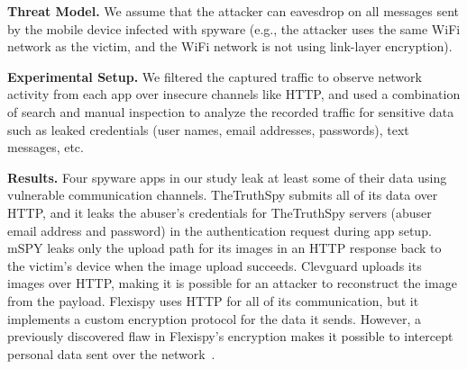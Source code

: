 \textbf{Threat Model.} We assume that the attacker can eavesdrop on
all messages sent by the mobile device infected with spyware (e.g.,
the attacker uses the same WiFi network as the victim, and the WiFi
network is not using link-layer encryption).



\textbf{Experimental Setup.}
We filtered the captured traffic to observe network activity from each app over
insecure channels like HTTP, and used a combination of search and
manual inspection to analyze the recorded traffic for sensitive data
such as leaked credentials (user names, email addresses, passwords),
text messages,
etc.



\textbf{Results.}  Four spyware apps in our study leak at least some
of their data using vulnerable communication channels.  TheTruthSpy
submits all of its data over HTTP, and it leaks the abuser's
credentials for TheTruthSpy servers (abuser email address and
password) in the authentication request during app setup.
mSPY leaks only
the upload path for its images in an HTTP response back to the
victim's device when the image upload succeeds.
Clevguard uploads its images over HTTP, making it is possible for an attacker to reconstruct the image from the payload.  Flexispy uses
HTTP for all of its communication, but it implements a custom
encryption protocol for the data it sends.  However, a previously
discovered flaw in Flexispy's encryption makes it possible to
intercept personal data sent over the
network~\cite{Stalking85:online}.

